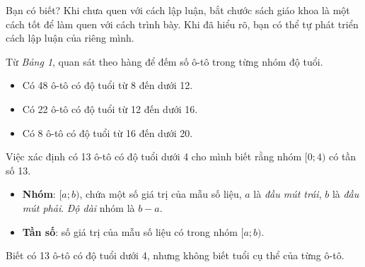 \documentclass[
  letterpaper,
  DIV=11,
  numbers=noendperiod]{scrartcl}
\providecommand{\tightlist}{%
  \setlength{\itemsep}{0pt}\setlength{\parskip}{0pt}}\usepackage{longtable,booktabs,array}
\begin{document}
\begin{tcolorbox}[enhanced jigsaw, opacityback=0, opacitybacktitle=0.6, colback=white, left=2mm, arc=.35mm, toprule=.15mm, title={Mẹo}, bottomtitle=1mm, coltitle=black, breakable, bottomrule=.15mm, rightrule=.15mm, colbacktitle=quarto-callout-note-color!10!white, leftrule=.75mm, colframe=quarto-callout-note-color-frame, toptitle=1mm, titlerule=0mm]

Bạn có biết? Khi chưa quen với cách lập luận, bắt chước sách giáo khoa
là một cách tốt để làm quen với cách trình bày. Khi đã hiểu rõ, bạn có
thể tự phát triển cách lập luận của riêng mình.

\end{tcolorbox}

Từ \emph{Bảng 1}, quan sát theo hàng để đếm số ô-tô trong từng nhóm độ
tuổi.

\begin{itemize}
\tightlist
\item
  Có 48 ô-tô có độ tuổi từ 8 đến dưới 12.
\item
  Có 22 ô-tô có độ tuổi từ 12 đến dưới 16.
\item
  Có 8 ô-tô có độ tuổi từ 16 đến dưới 20.
\end{itemize}

\begin{tcolorbox}[enhanced jigsaw, opacityback=0, opacitybacktitle=0.6, colback=white, left=2mm, arc=.35mm, toprule=.15mm, title={Nhóm \& tần số}, bottomtitle=1mm, coltitle=black, breakable, bottomrule=.15mm, rightrule=.15mm, colbacktitle=quarto-callout-note-color!10!white, leftrule=.75mm, colframe=quarto-callout-note-color-frame, toptitle=1mm, titlerule=0mm]

Việc xác định có 13 ô-tô có độ tuổi dưới 4 cho mình biết rằng nhóm
\([0;4)\) có tần số 13.

\begin{itemize}
\tightlist
\item
  \textbf{Nhóm}: \([a; b)\), chứa một số giá trị của mẫu số liệu, \(a\)
  là \emph{đầu mút trái}, \(b\) là \emph{đầu mút phải}. \emph{Độ dài}
  nhóm là \(b-a\).
\item
  \textbf{Tần số}: số giá trị của mẫu số liệu có trong nhóm \([a; b)\).
\end{itemize}

Biết có 13 ô-tô có độ tuổi dưới 4, nhưng không biết tuổi cụ thể của từng
ô-tô.

\end{tcolorbox}
\end{document}
